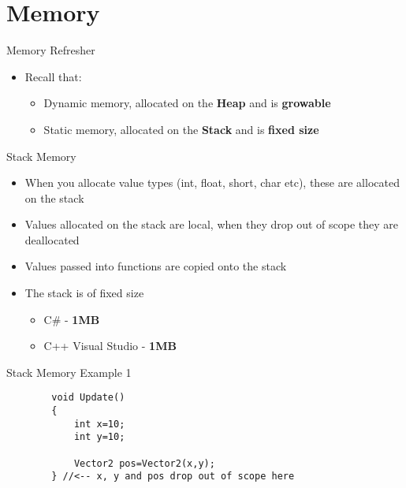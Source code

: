 \part{Memory}
\frame{\partpage}

\begin{frame}{Memory Refresher}
	\begin{itemize}
		\pause \item Recall that:
		\begin{itemize}
			\pause \item Dynamic memory, allocated on the \textbf{Heap} and is \textbf{growable}
			\pause \item Static memory, allocated on the \textbf{Stack} and is \textbf{fixed size}
		\end{itemize}
	\end{itemize}
\end{frame}

\begin{frame}{Stack Memory}
	\begin{itemize}
		\pause \item When you allocate value types (int, float, short, char etc), these are allocated on the stack
		\pause \item Values allocated on the stack are local, when they drop out of scope they are deallocated  
		\pause \item Values passed into functions are copied onto the stack
		\pause \item The stack is of fixed size
		\begin{itemize}
			\item C\# - \textbf{1MB}
			\item C++ Visual Studio - \textbf{1MB}
		\end{itemize}
	\end{itemize}
\end{frame}

\begin{frame}[fragile]{Stack Memory Example 1}
	\begin{lstlisting}
		void Update()
		{
			int x=10;
			int y=10;
	
			Vector2 pos=Vector2(x,y);
		} //<-- x, y and pos drop out of scope here
	\end{lstlisting} 
\end{frame}

